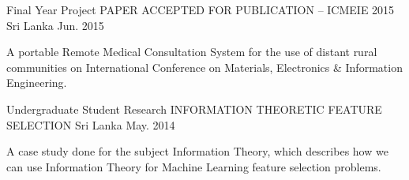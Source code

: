 


\begin{cventries}


    \cventry
        {Final Year Project} %
        {PAPER ACCEPTED FOR PUBLICATION – ICMEIE 2015} %
        {Sri Lanka} %
        {Jun. 2015} %
        { %
            \begin{cvitems}
                \item {A portable Remote Medical Consultation System for the use of distant rural communities on International Conference on Materials, Electronics \& Information Engineering.}
            \end{cvitems}
        }


    \cventry
        {Undergraduate Student Research} %
        {INFORMATION THEORETIC FEATURE SELECTION} %
        {Sri Lanka} %
        {May. 2014} %
        { %
            \begin{cvitems}
                \item {A case study done for the subject Information Theory, which describes how we can use Information Theory for Machine Learning feature selection problems.}
            \end{cvitems}
        }


\end{cventries}